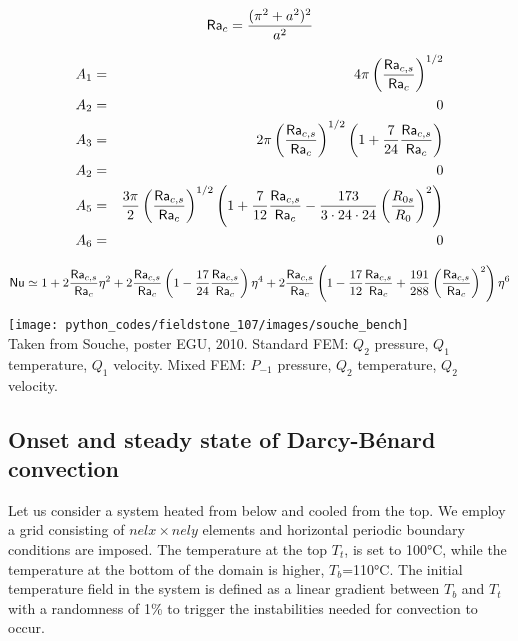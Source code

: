 \[
{\mathsf{Ra}}_c = \frac{(\pi^2+a^2)^2}{a^2}
\]

\begin{eqnarray}
A_1&=&4\pi \left( \frac{{\mathsf{Ra}}_{c,s}}{{\mathsf{Ra}}_c} \right)^{1/2} \nonumber\\
A_2 &=& 0 \nonumber\\
A_3&=&2\pi \left(\frac{{\mathsf{Ra}}_{c,s}}{{\mathsf{Ra}}_c} \right)^{1/2} \left(1 + \frac{7}{24} \frac{{\mathsf{Ra}}_{c,s}}{{\mathsf{Ra}}_c}   \right) \nonumber\\
A_2 &=& 0 \nonumber\\
A_5&=&\frac{3\pi}{2} \left(\frac{{\mathsf{Ra}}_{c,s}}{{\mathsf{Ra}}_c} \right)^{1/2}
\left(1+\frac{7}{12} \frac{{\mathsf{Ra}}_{c,s}}{{\mathsf{Ra}}_c} -
\frac{173}{3\cdot24\cdot24} \left(\frac{R_{0s}}{R_0}\right) ^2 
\right) \nonumber\\
A_6 &=& 0 \nonumber
\end{eqnarray}


\[
{\mathsf{Nu}}
\simeq 1 + 2 \frac{{\mathsf{Ra}}_{c,s}}{{\mathsf{Ra}}_c} \eta^2
+ 2 \frac{{\mathsf{Ra}}_{c,s}}{{\mathsf{Ra}}_c}
\left( 1 -\frac{17}{24}\frac{{\mathsf{Ra}}_{c,s}}{{\mathsf{Ra}}_c} \right) \eta^4
+2 \frac{{\mathsf{Ra}}_{c,s}}{{\mathsf{Ra}}_c}
\left( 
1 -\frac{17}{12}\frac{{\mathsf{Ra}}_{c,s}}{{\mathsf{Ra}}_c}
+ \frac{191}{288} \left(\frac{{\mathsf{Ra}}_{c,s}}{{\mathsf{Ra}}_c}\right) ^2
\right) \eta^6 
\]



\begin{center}
\texttt{[image: python\_codes/fieldstone\_107/images/souche\_bench]}\\
Taken from Souche, poster EGU, 2010. Standard FEM: $Q_2$ pressure, 
$Q_1$ temperature, $Q_1$ velocity. 
Mixed FEM: $P_{-1}$ pressure, $Q_2$ temperature, $Q_2$ velocity.
\end{center}





\subsection*{Onset and steady state of Darcy-B\'enard convection}

Let us consider a system heated from below and cooled from the top. We employ a 
grid consisting of $nelx\times nely$ elements and horizontal periodic boundary conditions are imposed. 
The temperature at the top $T_t$, is set to 100\si{\celsius}, while the temperature at the 
bottom of the domain is higher, $T_b$=110\si{\celsius}. The initial temperature field in the system is defined 
as a linear gradient between $T_b$ and $T_t$ with a randomness of 1\% to trigger the 
instabilities needed for convection to occur. 

